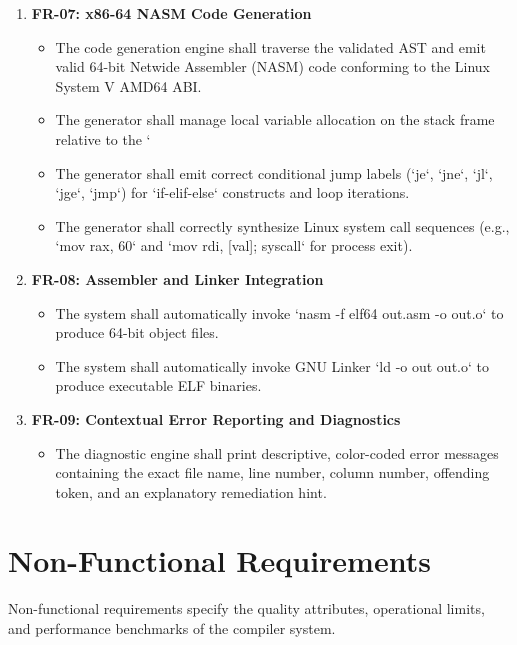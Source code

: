 \begin{enumerate}
    \item \textbf{FR-07: x86-64 NASM Code Generation}
    \begin{itemize}
        \item The code generation engine shall traverse the validated AST and emit valid 64-bit Netwide Assembler (NASM) code conforming to the Linux System V AMD64 ABI.
        \item The generator shall manage local variable allocation on the stack frame relative to the `%
        \item The generator shall emit correct conditional jump labels (`je`, `jne`, `jl`, `jge`, `jmp`) for `if-elif-else` constructs and loop iterations.
        \item The generator shall correctly synthesize Linux system call sequences (e.g., `mov rax, 60` and `mov rdi, [val]; syscall` for process exit).
    \end{itemize}

    \item \textbf{FR-08: Assembler and Linker Integration}
    \begin{itemize}
        \item The system shall automatically invoke `nasm -f elf64 out.asm -o out.o` to produce 64-bit object files.
        \item The system shall automatically invoke GNU Linker `ld -o out out.o` to produce executable ELF binaries.
    \end{itemize}

    \item \textbf{FR-09: Contextual Error Reporting and Diagnostics}
    \begin{itemize}
        \item The diagnostic engine shall print descriptive, color-coded error messages containing the exact file name, line number, column number, offending token, and an explanatory remediation hint.
    \end{itemize}
\end{enumerate}

\section{Non-Functional Requirements}
Non-functional requirements specify the quality attributes, operational limits, and performance benchmarks of the compiler system.

